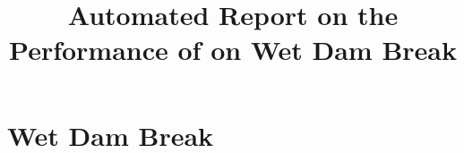 \documentclass[11pt,a4paper]{report}
\begin{document}
 

\title{Automated Report on the Performance of \anuga{} on Wet Dam Break}

\chapter{Wet Dam Break}


\end{document}
